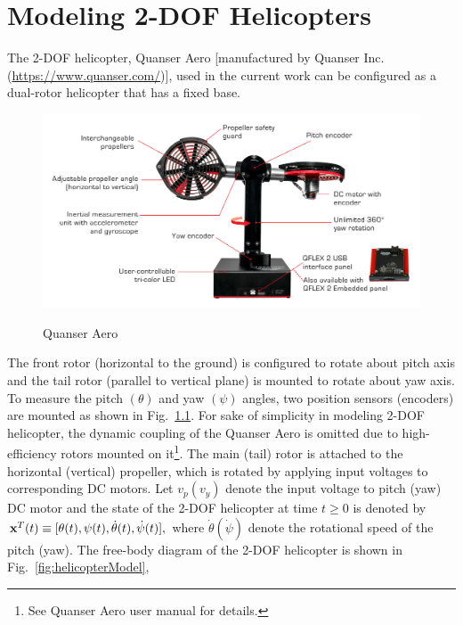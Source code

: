 \chapter{Modeling 2-DOF Helicopters}
The 2-DOF helicopter, Quanser Aero [manufactured by Quanser Inc. (\href{https://www.quanser.com/}{https://www.quanser.com/})], used in the current work can be configured as a dual-rotor helicopter that has a fixed base. 
\begin{figure}[!htbp]
    \centering
    \includegraphics[width=.75\textwidth,keepaspectratio=true]{figs/img/quanserAero.png}
    \label{fig:quanserAero}
    \caption{Quanser Aero}
\end{figure}
The front rotor (horizontal to the ground) is configured to rotate about pitch axis and the tail rotor (parallel to vertical plane) is mounted to rotate about yaw axis. To measure the pitch $(\theta)$ and yaw $(\psi)$ angles, two position sensors (encoders) are mounted as shown in Fig.~\ref{fig:quanserAero}. For sake of simplicity in modeling 2-DOF helicopter, the  dynamic coupling of the Quanser Aero is omitted due to high-efficiency rotors mounted on it\footnote{See Quanser Aero user manual for details.}. The main (tail) rotor is attached to the horizontal (vertical) propeller, which is rotated by applying input voltages to corresponding DC motors. Let $v_p(v_y)$ denote the input voltage to pitch (yaw) DC motor and the state of the 2-DOF helicopter at time $t\ge 0$ is denoted by ${\bf x}^T(t) \equiv [\theta(t),\psi(t),\dot\theta(t),\dot\psi(t)],$ where $\dot\theta(\dot\psi)$ denote the rotational speed of the pitch (yaw). The free-body diagram of the 2-DOF helicopter is shown in Fig.~\ref{fig:helicopterModel}, 

